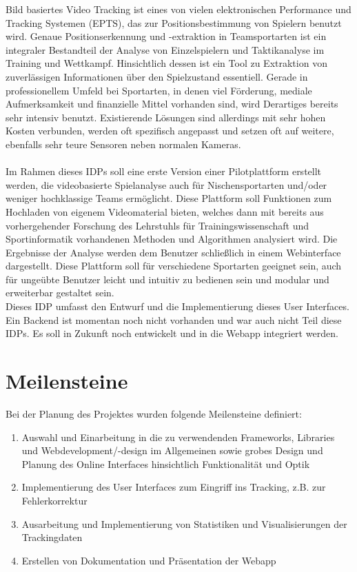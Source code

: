 Bild basiertes Video Tracking ist eines von vielen elektronischen Performance und
Tracking Systemen (EPTS), das zur Positionsbestimmung von Spielern benutzt wird.
Genaue Positionserkennung und -extraktion in Teamsportarten ist ein integraler
Bestandteil der Analyse von Einzelspielern und Taktikanalyse im Training und
Wettkampf. Hinsichtlich dessen ist ein Tool zu Extraktion von zuverlässigen
Informationen über den Spielzustand essentiell. Gerade in professionellem Umfeld
bei Sportarten, in denen viel Förderung, mediale Aufmerksamkeit und finanzielle Mittel vorhanden sind, wird Derartiges bereits sehr intensiv benutzt. Existierende Lösungen
sind allerdings mit sehr hohen Kosten verbunden, werden oft spezifisch angepasst
und setzen oft auf weitere, ebenfalls sehr teure Sensoren neben normalen Kameras.
\\
\\
Im Rahmen dieses IDPs soll eine erste Version einer Pilotplattform erstellt werden,
die videobasierte Spielanalyse auch für Nischensportarten und/oder weniger
hochklassige Teams ermöglicht.
Diese Plattform soll Funktionen zum Hochladen von eigenem Videomaterial bieten,
welches dann mit bereits aus vorhergehender Forschung des Lehrstuhls für
Trainingswissenschaft und Sportinformatik vorhandenen Methoden und Algorithmen
analysiert wird. Die Ergebnisse der Analyse werden dem Benutzer schließlich in einem
Webinterface dargestellt.
Diese Plattform soll für verschiedene Sportarten geeignet sein, auch für ungeübte
Benutzer leicht und intuitiv zu bedienen sein und modular und erweiterbar gestaltet
sein.
\\
Dieses IDP umfasst den Entwurf und die Implementierung dieses User
Interfaces. Ein Backend ist momentan noch nicht vorhanden und war auch nicht Teil diese IDPs. Es soll in Zukunft noch entwickelt und in die Webapp integriert werden.


\section{Meilensteine}

Bei der Planung des Projektes wurden folgende Meilensteine definiert:

\begin{enumerate}
    \item Auswahl und Einarbeitung in die zu verwendenden Frameworks, Libraries und Webdevelopment/\linebreak -design im Allgemeinen sowie grobes Design und Planung des Online Interfaces hinsichtlich Funktionalität und Optik
    \item Implementierung des User Interfaces zum Eingriff ins Tracking, z.B. zur Fehlerkorrektur
    \item Ausarbeitung und Implementierung von Statistiken und Visualisierungen der Trackingdaten
    \item Erstellen von Dokumentation und Präsentation der Webapp
\end{enumerate}


